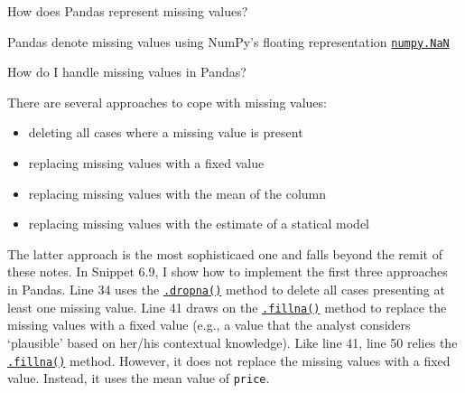 \documentclass[a4paper,11pt]{book}
\numberwithin{figure}{chapter}
\numberwithin{table}{chapter}
\newcommand{\question}[1]{%
    \begin{tcolorbox}[colback=comp_c!10,colframe=comp_c,sidebyside align=top,width=\linewidth,before skip=1ex]
        #1
    \end{tcolorbox}
    \switchcolumn%
}
\newcommand{\note}[1]{%
    \begin{tcolorbox}[colback=white!0,colframe=white!10,width=\linewidth,before skip=1ex]
        #1
    \end{tcolorbox}
}
\begin{document}
\begin{paracol}{2}
	\question{\raggedright How does Pandas represent missing values?}
	\note{Pandas denote missing values using NumPy's floating representation \href{https://numpy.org/doc/stable/reference/constants.html?highlight=nan#numpy.NaN}{\texttt{numpy.NaN}}
	}
\end{paracol}

\begin{paracol}{2}
	\question{\raggedright How do I handle missing values in Pandas?}
	\note{There are several approaches to cope with missing values:
	\begin{itemize}
		\item deleting all cases where a missing value is present
		\item replacing missing values with a fixed value
		\item replacing missing values with the mean of the column
		\item replacing missing values with the estimate of a statical model
	\end{itemize}
	
	\quad The latter approach is the most sophisticaed one and falls beyond the remit of these notes. In Snippet 6.9, I show how to implement the first three approaches in Pandas. Line 34 uses the \href{https://pandas.pydata.org/docs/reference/api/pandas.DataFrame.dropna.html?highlight=dropna}{\texttt{.dropna()}} method to delete all cases presenting at least one missing value. Line 41 draws on the \href{https://pandas.pydata.org/docs/reference/api/pandas.DataFrame.fillna.html?highlight=fillna#pandas.DataFrame.fillna}{\texttt{.fillna()}} method to replace the missing values with a fixed value (e.g., a value that the analyst considers `plausible' based on her/his contextual knowledge). Like line 41, line 50 relies the \href{https://pandas.pydata.org/docs/reference/api/pandas.DataFrame.fillna.html?highlight=fillna#pandas.DataFrame.fillna}{\texttt{.fillna()}} method. However, it does not replace the missing values with a fixed value. Instead, it uses the mean value of \texttt{price}.
	} 
\end{paracol}
\end{document}
